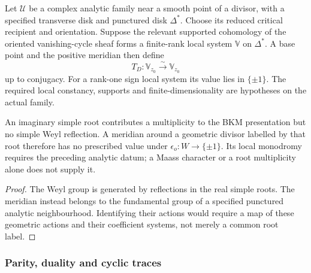 \begin{definition}
\label{def:local-divisor-monodromy-datum}
Let \(\mathcal U\) be a complex analytic family near a smooth point
of a divisor, with a specified transverse disk and punctured disk
\(\Delta^*\).  Choose its reduced critical recipient and orientation.
Suppose the relevant supported cohomology of the oriented
vanishing-cycle sheaf forms a finite-rank local system \(\mathbb V\)
on \(\Delta^*\).  A base point and the positive meridian then define
\[
 T_D:\mathbb V_{z_0}\xrightarrow{\sim}\mathbb V_{z_0}
\]
up to conjugacy.  For a rank-one sign local system its value lies in
\(\{\pm1\}\).  The required local constancy, supports and
finite-dimensionality are hypotheses on the actual family.
\end{definition}

\begin{proposition}
\label{prop:imaginary-divisor-not-weyl-monodromy}
\label{prop:local-divisor-monodromy-maass-irrelevance}
An imaginary simple root contributes a multiplicity to the BKM
presentation but no simple Weyl reflection.  A meridian around a
geometric divisor labelled by that root therefore has no prescribed
value under \(\epsilon_o:W\to\{\pm1\}\).  Its local monodromy
requires the preceding analytic datum; a Maass character or a root
multiplicity alone does not supply it.
\end{proposition}
\begin{proof}
The Weyl group is generated by reflections in the real simple roots.
The meridian instead belongs to the fundamental group of a specified
punctured analytic neighbourhood.  Identifying their actions would
require a map of these geometric actions and their coefficient
systems, not merely a common root label.
\end{proof}

\subsubsection*{Parity, duality and cyclic traces}

